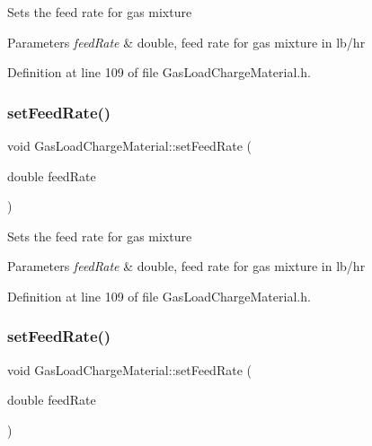 Sets the feed rate for gas mixture 
\begin{DoxyParams}{Parameters}
{\em feed\+Rate} & double, feed rate for gas mixture in lb/hr \\
\hline
\end{DoxyParams}


Definition at line 109 of file Gas\+Load\+Charge\+Material.\+h.

\mbox{\label{class_gas_load_charge_material_a922b728dfd109d1c1684d7dfad82ec8e}} 
\subsubsection{\texorpdfstring{set\+Feed\+Rate()}{setFeedRate()}\hspace{0.1cm}{\footnotesize\ttfamily [2/3]}}
{\footnotesize\ttfamily void Gas\+Load\+Charge\+Material\+::set\+Feed\+Rate (\begin{DoxyParamCaption}\item[{double}]{feed\+Rate }\end{DoxyParamCaption})\hspace{0.3cm}{\ttfamily [inline]}}

Sets the feed rate for gas mixture 
\begin{DoxyParams}{Parameters}
{\em feed\+Rate} & double, feed rate for gas mixture in lb/hr \\
\hline
\end{DoxyParams}


Definition at line 109 of file Gas\+Load\+Charge\+Material.\+h.

\mbox{\label{class_gas_load_charge_material_a922b728dfd109d1c1684d7dfad82ec8e}} 
\subsubsection{\texorpdfstring{set\+Feed\+Rate()}{setFeedRate()}\hspace{0.1cm}{\footnotesize\ttfamily [3/3]}}
{\footnotesize\ttfamily void Gas\+Load\+Charge\+Material\+::set\+Feed\+Rate (\begin{DoxyParamCaption}\item[{double}]{feed\+Rate }\end{DoxyParamCaption})\hspace{0.3cm}{\ttfamily [inline]}}

